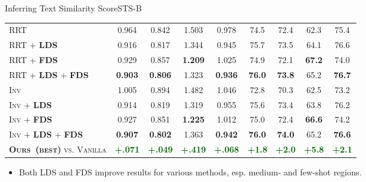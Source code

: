 \begin{frame}{Inferring Text Similarity Score}{STS-B}
\begin{table}[!htbp]
\begin{center}
{\begin{tabular}{l|cccc|cccc}
					\textsc{RRT}         & 0.964 & 0.842 & 1.503  & 0.978 & 74.5 & 72.4 & 62.3  & 75.4 \\[1.2pt]
					\textsc{RRT} + \textbf{\textsc{LDS}}     & {0.916} & 0.817 & {1.344}  & 0.945 & {75.7} & {73.5} & {64.1}  & {76.6} \\[1.2pt]
					\textsc{RRT} + \textbf{\textsc{FDS}} & 0.929 & 0.857 & \textbf{1.209}  & 1.025     & 74.9     & 72.1     & \textbf{67.2}      & 74.0 \\[1.2pt]
					\textsc{RRT} + \textbf{\textsc{LDS}} + \textbf{\textsc{FDS}} & \textbf{0.903} & \textbf{0.806} & 1.323  & \textbf{0.936}     & \textbf{76.0}     &\textbf{73.8}     & 65.2      & \textbf{76.7} \\ \midrule\midrule
					\textsc{Inv}      & 1.005 & 0.894 & 1.482  & 1.046 & 72.8 & 70.3 & 62.5  & 73.2 \\[1.2pt]
					\textsc{Inv} + \textbf{\textsc{LDS}} & 0.914 & 0.819 & {1.319}  & {0.955} & {75.6} & {73.4} & {63.8}  & {76.2} \\[1.2pt]
					\textsc{Inv} + \textbf{\textsc{FDS}} & 0.927 & 0.851 & \textbf{1.225}  & 1.012     & 75.0     & 72.4     & \textbf{66.6}      & 74.2 \\[1.2pt]
					\textsc{Inv} + \textbf{\textsc{LDS}} + \textbf{\textsc{FDS}} & \textbf{0.907} & \textbf{0.802} & 1.363  & \textbf{0.942}     & \textbf{76.0}     & \textbf{74.0}     & 65.2      & \textbf{76.6} \\ \midrule\midrule
					\textsc{\textbf{Ours~(best)} vs. Vanilla}   & \textcolor{darkgreen}{\textbf{+.071}} & \textcolor{darkgreen}{\textbf{+.049}} & \textcolor{darkgreen}{\textbf{+.419}} & \textcolor{darkgreen}{\textbf{+.068}} & \textcolor{darkgreen}{\textbf{+1.8}} & \textcolor{darkgreen}{\textbf{+2.0}} & \textcolor{darkgreen}{\textbf{+5.8}} & \textcolor{darkgreen}{\textbf{+2.1}} \\
					\bottomrule[1.5pt]
				\end{tabular}
			}
		\end{center}
	\end{table}
	\begin{itemize}
		\item Both LDS and FDS improve results for various methods, esp. medium- and few-shot regions.
	\end{itemize}
\end{frame}

